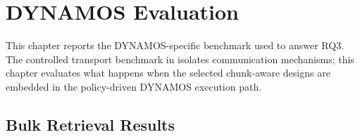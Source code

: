\chapter{DYNAMOS Evaluation}\label{ch:dynamos-evaluation}

This chapter reports the DYNAMOS-specific benchmark used to answer RQ3. The controlled transport benchmark in  isolates communication mechanisms; this chapter evaluates what happens when the selected chunk-aware designs are embedded in the policy-driven DYNAMOS execution path.

\section{Bulk Retrieval Results}\label{sec:dynamos-rq3}

\begin{table}[!htbp]
    \centering
    \scriptsize
    \caption{Average completion latency for DYNAMOS bulk retrieval. All cells completed 20/20 valid repetitions.}
    \label{tab:dynamos-rq3-latency}
    \setlength{\tabcolsep}{3pt}
\end{table}


